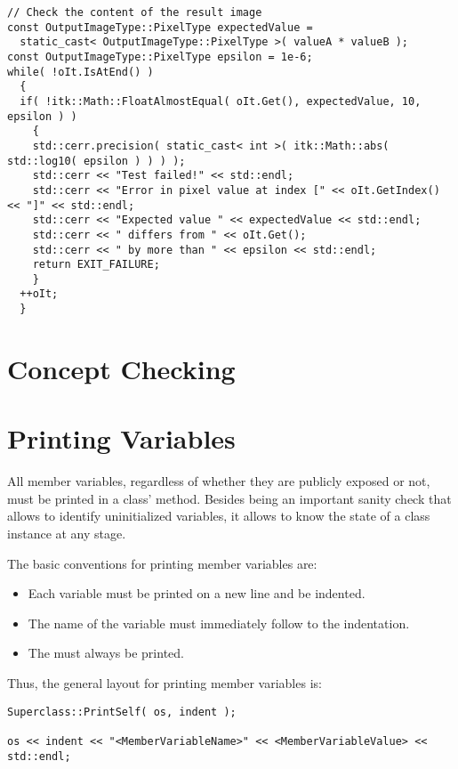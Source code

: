 \small
\begin{verbatim}
// Check the content of the result image
const OutputImageType::PixelType expectedValue =
  static_cast< OutputImageType::PixelType >( valueA * valueB );
const OutputImageType::PixelType epsilon = 1e-6;
while( !oIt.IsAtEnd() )
  {
  if( !itk::Math::FloatAlmostEqual( oIt.Get(), expectedValue, 10, epsilon ) )
    {
    std::cerr.precision( static_cast< int >( itk::Math::abs( std::log10( epsilon ) ) ) );
    std::cerr << "Test failed!" << std::endl;
    std::cerr << "Error in pixel value at index [" << oIt.GetIndex() << "]" << std::endl;
    std::cerr << "Expected value " << expectedValue << std::endl;
    std::cerr << " differs from " << oIt.Get();
    std::cerr << " by more than " << epsilon << std::endl;
    return EXIT_FAILURE;
    }
  ++oIt;
  }
\end{verbatim}
\normalsize


\section{Concept Checking}
\label{sec:ConceptChecking}


\section{Printing Variables}
\label{sec:PrintingVariables}

All member variables, regardless of whether they are publicly exposed or not,
must be printed in a class'  method. Besides being an
important sanity check that allows to identify uninitialized variables, it
allows to know the state of a class instance at any stage.

The basic conventions for printing member variables are:
\begin{itemize}
\item Each variable must be printed on a new line and be indented.
\item The name of the variable must immediately follow to the indentation.
\item The  must always be printed.
\end{itemize}

Thus, the general layout for printing member variables is:

\small
\begin{verbatim}
Superclass::PrintSelf( os, indent );

os << indent << "<MemberVariableName>" << <MemberVariableValue> << std::endl;
\end{verbatim}
\normalsize

